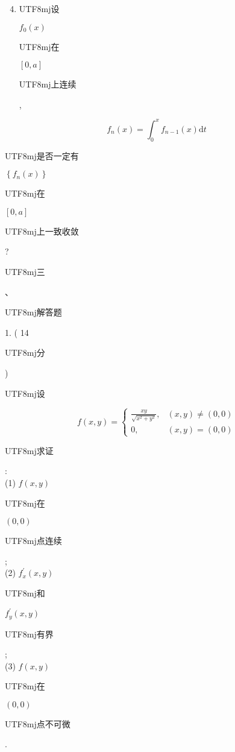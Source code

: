 \documentclass[10pt]{article}
\begin{document}
\begin{enumerate}
  \setcounter{enumi}{3}
  \item \begin{CJK}{UTF8}{mj}设\end{CJK} $f_{0}(x)$ \begin{CJK}{UTF8}{mj}在\end{CJK} $[0, a]$ \begin{CJK}{UTF8}{mj}上连续\end{CJK},
\end{enumerate}
$$
f_{n}(x)=\int_{0}^{x} f_{n-1}(x) \mathrm{d} t
$$
\begin{CJK}{UTF8}{mj}是否一定有\end{CJK} $\left\{f_{n}(x)\right\}$ \begin{CJK}{UTF8}{mj}在\end{CJK} $[0, a]$ \begin{CJK}{UTF8}{mj}上一致收敛\end{CJK}?

\begin{CJK}{UTF8}{mj}三\end{CJK}、\begin{CJK}{UTF8}{mj}解答题\end{CJK} 1. ( 14 \begin{CJK}{UTF8}{mj}分\end{CJK}) \begin{CJK}{UTF8}{mj}设\end{CJK}
$$
f(x, y)= \begin{cases}\frac{x y}{\sqrt{x^{2}+y^{2}}}, & (x, y) \neq(0,0) \\ 0, & (x, y)=(0,0)\end{cases}
$$
\begin{CJK}{UTF8}{mj}求证\end{CJK}:\\
(1) $f(x, y)$ \begin{CJK}{UTF8}{mj}在\end{CJK} $(0,0)$ \begin{CJK}{UTF8}{mj}点连续\end{CJK};\\
(2) $f_{x}^{\prime}(x, y)$ \begin{CJK}{UTF8}{mj}和\end{CJK} $f_{y}^{\prime}(x, y)$ \begin{CJK}{UTF8}{mj}有界\end{CJK};\\
(3) $f(x, y)$ \begin{CJK}{UTF8}{mj}在\end{CJK} $(0,0)$ \begin{CJK}{UTF8}{mj}点不可微\end{CJK}.
\end{document}
